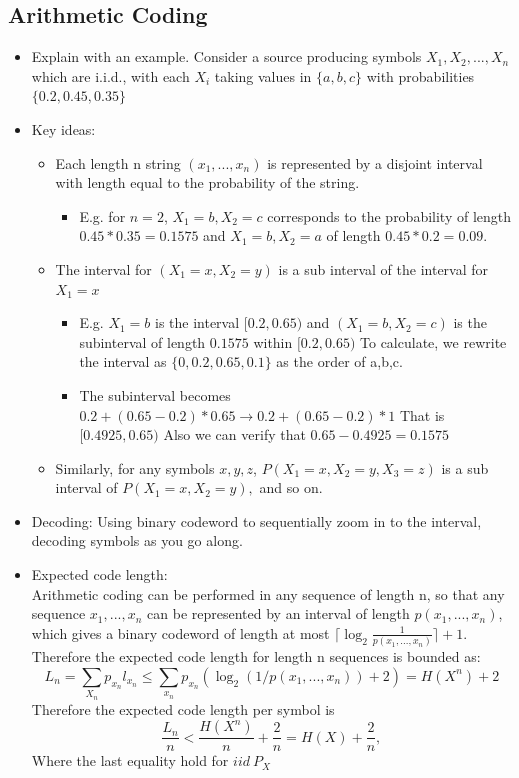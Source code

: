 \documentclass[24pt]{article}
\begin{document}
\subsection{Arithmetic Coding}
\begin{itemize}

\item Explain with an example. Consider a source producing symbols $X_1,X_2,...,X_n$ which are i.i.d., with each $X_i$ taking values in $\{a,b,c\}$ with probabilities $\{0.2,0.45,0.35\}$
\item Key ideas:
\begin{itemize}
\item Each length n string $(x_1,...,x_n)$ is represented by a disjoint interval with length equal to the probability of the string. 
\begin{itemize}
\item E.g. for $n=2$, $X_1=b,X_2=c$ corresponds to the probability of length $0.45 * 0.35=0.1575$ and $X_1=b,X_2=a$ of length $0.45 * 0.2=0.09$.
\end{itemize}
\item The interval for $(X_1=x,X_2=y)$ is a sub interval of the interval for $X_1=x$ 
\begin{itemize}
\item E.g. $X_1 = b$ is the interval $[0.2,0.65)$ and $(X_1 = b, X_2=c)$ is the subinterval of length $0.1575$ within  $[0.2,0.65)$ To calculate, we rewrite the interval as $\{0,0.2,0.65,0.1\}$ as the order of a,b,c.
\item The subinterval becomes $0.2 + (0.65-0.2) * 0.65 \rightarrow 0.2 + (0.65-0.2) * 1$ That is $[0.4925,0.65)$ Also we can verify that $0.65 - 0.4925 = 0.1575$
\end{itemize}  
\item Similarly, for any symbols $x,y,z$, $P(X_1=x,X_2=y,X_3=z)$ is a sub interval of $P(X_1=x,X_2=y),$ and so on.
\end{itemize}
\item Decoding: Using binary codeword to sequentially zoom in to the interval, decoding symbols as you go along.
\item Expected code length:\\
Arithmetic coding can be performed in any sequence of length n, so that any sequence $x_1,...,x_n$ can be represented by an interval of length $p(x_1,...,x_n)$, which gives a binary codeword of length at most $\lceil \log_2\frac{1}{p(x_1,...,x_n)} \rceil + 1$. \\
Therefore the expected code length for length n sequences is bounded as:
\[
L_n = \sum_{X_n} p_{x_n}\mathit{l}_{x_n} \le \sum_{x_n} p_{x_n} (\log_2\left(1/p(x_1,...,x_n)\right)+2) = H(X^n) + 2
\]
Therefore the expected code length per symbol is 
\[
\frac{L_n}{n} < \frac{H(X^n)}{n} + \frac{2}{n} = H(X) + \frac{2}{n},
\]
Where the last equality hold for $iid ~ P_X$
\end{itemize}
\end{document}
